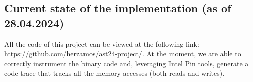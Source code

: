 \documentclass[acmsmall,review, nonacm]{acmart}
\begin{document}
\subsection{Current state of the implementation (as of 28.04.2024)}
All the code of this project can be viewed at the following link: \url{https://github.com/herzamos/ast24-project/}.
At the moment, we are able to correctly instrument the binary code and, leveraging Intel Pin tools, generate 
a code trace that tracks all the memory accesses (both reads and writes).












\end{document}
